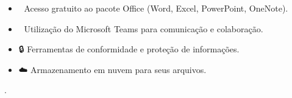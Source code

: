 \documentclass[
  a4paper,
]{book}
\providecommand{\tightlist}{%
  \setlength{\itemsep}{0pt}\setlength{\parskip}{0pt}}\usepackage{longtable,booktabs,array}
\begin{document}
\begin{enumerate}
\begin{itemize}
{\begin{enumerate}
        \begin{itemize}
        \tightlist
        \item
          📄 Acesso gratuito ao pacote Office (Word, Excel, PowerPoint,
          OneNote).
        \item
          💬 Utilização do Microsoft Teams para comunicação e
          colaboração.
        \item
          🔒 Ferramentas de conformidade e proteção de informações.
        \item
          ☁️ Armazenamento em nuvem para seus arquivos.
        \end{itemize}
      \end{enumerate}}.
  \end{itemize}
\end{enumerate}
\end{document}
